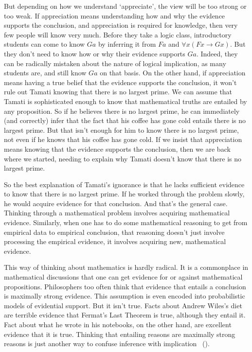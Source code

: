 \documentclass[
  10pt,
  letterpaper,
  twoside]{scrbook}
\begin{document}
But depending on how we understand `appreciate', the view will be too
strong or too weak. If appreciation means understanding how and why the
evidence supports the conclusion, and appreciation is required for
knowledge, then very few people will know very much. Before they take a
logic class, introductory students can come to know \(Ga\) by inferring
it from \(Fa\) and \(\forall x (Fx \rightarrow Gx)\). But they don't
need to know how or why their evidence supports \(Ga\). Indeed, they can
be radically mistaken about the nature of logical implication, as many
students are, and still know \(Ga\) on that basis. On the other hand, if
appreciation means having a true belief that the evidence supports the
conclusion, it won't rule out {Tamati} knowing that there is no largest
prime. We can assume that {Tamati} is sophisticated enough to know that
mathematical truths are entailed by any proposition. So if he believes
there is no largest prime, he can immediately (and correctly) infer that
the fact that his coffee has gone cold entails there is no largest
prime. But that isn't enough for him to know there is no largest prime,
not even if he knows that his coffee has gone cold. If we insist that
appreciation means knowing that the evidence supports the conclusion,
then we are back where we started, needing to explain why {Tamati}
doesn't know that there is no largest prime.

So the best explanation of {Tamati}'s ignorance is that he lacks
sufficient evidence to know that there is no largest prime. If he worked
through the problem slowly, he would acquire evidence for that
conclusion. And that's the general case. Thinking through a mathematical
problem involves acquiring mathematical evidence. Similarly, when one
has to do some mathematical reasoning to get from empirical data to
empirical conclusion, that reasoning doesn't just involve processing the
empirical evidence, it involves acquiring new, mathematical evidence.

This way of thinking about mathematics is hardly radical. It is a
commonplace in mathematical discussions that one can get evidence for or
against mathematical propositions. Philosophers too often think that
evidence that entails a conclusion is maximally strong evidence. This
assumption is even encoded into probabilistic models of evidential
support. But it isn't true. Facts about Andrew Wiles's diet are terrible
evidence that Fermat's Last Theorem is true, although they entail it.
Fact about what he wrote in his notebooks, on the other hand, are
excellent evidence that it is true. Thinking that entailing reasons are
maximally strong reasons is just another way to confuse inference with
implication ~().
\end{document}
